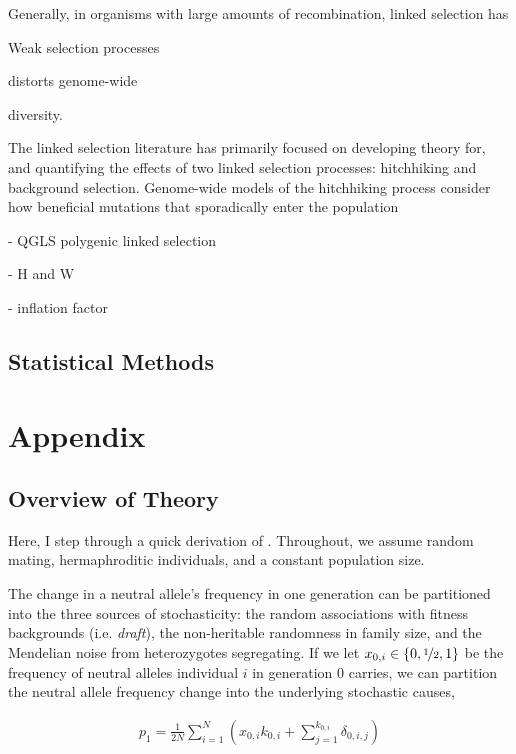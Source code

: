 \documentclass[11pt]{article}
\begin{document}
Generally, in organisms with large amounts of recombination, linked selection
has 


Weak selection processes 

distorts
genome-wide 

diversity.

The linked selection literature has primarily focused on developing theory for,
and quantifying the effects of two linked selection processes: hitchhiking and
background selection. Genome-wide models of the hitchhiking process consider
how beneficial mutations that sporadically enter the population 

- QGLS polygenic linked selection

- H and W

- inflation factor

\subsection*{Statistical Methods}

\section*{Appendix}

\subsection*{Overview of Theory}

Here, I step through a quick derivation of \textcite{Santiago1998-bs}.
Throughout, we assume random mating, hermaphroditic individuals, and a constant
population size. 

The change in a neutral allele's frequency in one generation can be partitioned
into the three sources of stochasticity: the random associations with fitness
backgrounds (i.e. \emph{draft}), the non-heritable randomness in family size,
and the Mendelian noise from heterozygotes segregating. If we let $x_{0,i} \in
\{0, \nicefrac{1}{2}, 1\}$ be the frequency of neutral alleles individual $i$
in generation 0 carries, we can partition the neutral allele frequency change
into the underlying stochastic causes,

\begin{align}
  p_1 = \frac{1}{2N} \sum_{i=1}^N \left( x_{0,i}k_{0,i} + \sum_{j=1}^{k_{0,i}} \delta_{0,i,j} \right)
\end{align}
\end{document}
